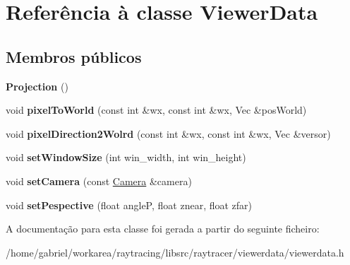 \hypertarget{classViewerData}{}\section{Referência à classe Viewer\+Data}
\label{classViewerData}
\subsection*{Membros públicos}
\begin{DoxyCompactItemize}
\item 
\mbox{\label{classViewerData_adb33c498d7487ec395b653fa6c6919e0}} 
{\bfseries Projection} ()
\item 
\mbox{\label{classViewerData_a3ee0f7787abc738bdb5e5a9230a9b43a}} 
void {\bfseries pixel\+To\+World} (const int \&wx, const int \&wx, Vec \&pos\+World)
\item 
\mbox{\label{classViewerData_a807be7d7ca8007b704042a1171dd4e31}} 
void {\bfseries pixel\+Direction2\+Wolrd} (const int \&wx, const int \&wx, Vec \&versor)
\item 
\mbox{\label{classViewerData_a03331984493c1546045dd937f16b36e9}} 
void {\bfseries set\+Window\+Size} (int win\+\_\+width, int win\+\_\+height)
\item 
\mbox{\label{classViewerData_afae331d6cb58e5bec58ced3bdabf3013}} 
void {\bfseries set\+Camera} (const \hyperlink{classCamera}{Camera} \&camera)
\item 
\mbox{\label{classViewerData_ac2e795bd6c13d03b5ed9e721c04eac0e}} 
void {\bfseries set\+Pespective} (float angleP, float znear, float zfar)
\end{DoxyCompactItemize}


A documentação para esta classe foi gerada a partir do seguinte ficheiro\+:\begin{DoxyCompactItemize}
\item 
/home/gabriel/workarea/raytracing/libsrc/raytracer/viewerdata/viewerdata.\+h\end{DoxyCompactItemize}
